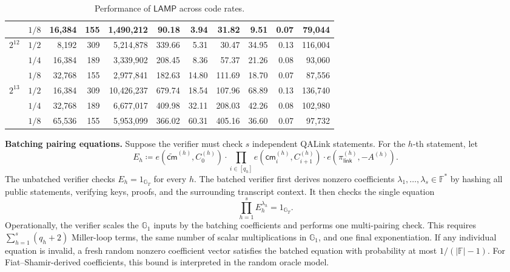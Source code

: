 \documentclass[conference,compsoc]{IEEEtran}
\newif\ifshowrevisions
\newenvironment{revblock}[1][]
  {%
    \ifshowrevisions
      \begin{tcolorbox}[
        breakable,
        colback=revisionyellow,
        colframe=revisionyellow,
        boxrule=0pt,
        arc=0pt,
        left=2pt,
        right=2pt,
        top=2pt,
        bottom=2pt,
        before skip=2pt,
        after skip=2pt,
        #1
      ]
    \fi
  }
  {%
    \ifshowrevisions
      \end{tcolorbox}
    \fi
  }
\newcommand{\cm}{\textsf{cm}}
\newcommand{\protocol}{\textsf{LAMP}}   %
\theoremstyle{plain}
\theoremstyle{definition}
\theoremstyle{remark}
\begin{document}
\begin{table}[!t]
\begin{revblock}[unbreakable]
\begin{tabular*}{\linewidth}{@{\extracolsep{\fill}}ccrrrrrrrrr@{}}
& \(1/8\) & 16{,}384 & 155 & 1{,}490{,}212 & 90.18 & 3.94 & 31.82 & 9.51 & 0.07 & 79{,}044 \\
\midrule
\multirow{3}{*}{\(2^{12}\)}
& \(1/2\) & 8{,}192 & 309 & 5{,}214{,}878 & 339.66 & 5.31 & 30.47 & 34.95 & 0.13 & 116{,}004 \\
& \(1/4\) & 16{,}384 & 189 & 3{,}339{,}902 & 208.45 & 8.36 & 57.37 & 21.26 & 0.08 & 93{,}060 \\
& \(1/8\) & 32{,}768 & 155 & 2{,}977{,}841 & 182.63 & 14.80 & 111.69 & 18.70 & 0.07 & 87{,}556 \\
\midrule
\multirow{3}{*}{\(2^{13}\)}
& \(1/2\) & 16{,}384 & 309 & 10{,}426{,}237 & 679.74 & 18.54 & 107.96 & 68.89 & 0.13 & 136{,}740 \\
& \(1/4\) & 32{,}768 & 189 & 6{,}677{,}017 & 409.98 & 32.11 & 208.03 & 42.26 & 0.08 & 102{,}980 \\
& \(1/8\) & 65{,}536 & 155 & 5{,}953{,}099 & 366.02 & 60.31 & 405.16 & 36.60 & 0.07 & 97{,}732 \\
\bottomrule
\end{tabular*}
\end{revblock}
\vspace{6pt}
\caption{Performance of \(\protocol\) across code rates.}
\label{tab:lamp-code-rates}
\end{table}

\noindent\textbf{Batching pairing equations.}
Suppose the verifier must check \(s\) independent QALink statements.  For the
\(h\)-th statement, let
\[
  E_h
  \coloneqq
  e(\widetilde{\cm}^{(h)},C^{(h)}_0)
  \cdot
  \prod_{i\in[q_h]} e(\cm^{(h)}_i,C^{(h)}_{i+1})
  \cdot
  e(\pi^{(h)}_{\mathsf{link}},-A^{(h)}).
\]
The unbatched verifier checks \(E_h=1_{\mathbb{G}_T}\) for every \(h\).  The
batched verifier first derives nonzero coefficients
\(\lambda_1,\ldots,\lambda_s\in\mathbb{F}^{\ast}\) by hashing all public
statements, verifying keys, proofs, and the surrounding transcript context.  It
then checks the single equation
\[
  \prod_{h=1}^{s} E_h^{\lambda_h}=1_{\mathbb{G}_T}.
\]
Operationally, the verifier scales the \(\mathbb{G}_1\) inputs by the batching
coefficients and performs one multi-pairing check.  This requires
\(\sum_{h=1}^{s}(q_h+2)\) Miller-loop terms, the same number of scalar
multiplications in \(\mathbb{G}_1\), and one final exponentiation.  If any
individual equation is invalid, a fresh random nonzero coefficient vector
satisfies the batched equation with probability at most
\(1/(|\mathbb{F}|-1)\).  For Fiat--Shamir-derived coefficients, this bound is
interpreted in the random oracle model.
\end{document}
